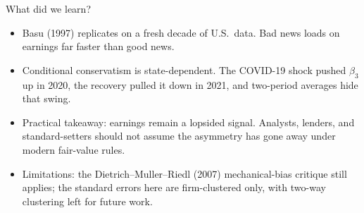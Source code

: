\documentclass[11pt,aspectratio=169]{beamer}
\begin{document}
\begin{frame}{What did we learn?}
  \begin{itemize}
    \item Basu (1997) replicates on a fresh decade of U.S.\ data. Bad
          news loads on earnings far faster than good news.
    \item Conditional conservatism is state-dependent. The COVID-19
          shock pushed $\beta_3$ up in 2020, the recovery pulled it
          down in 2021, and two-period averages hide that swing.
    \item Practical takeaway: earnings remain a lopsided signal.
          Analysts, lenders, and standard-setters should not assume the
          asymmetry has gone away under modern fair-value rules.
    \item Limitations: the Dietrich--Muller--Riedl (2007) mechanical-bias
          critique still applies; the standard errors here are
          firm-clustered only, with two-way clustering left for future
          work.
  \end{itemize}
\end{frame}
\end{document}
